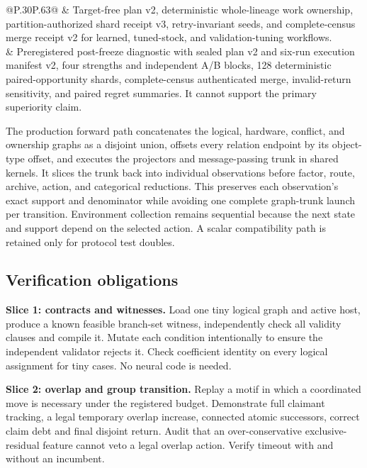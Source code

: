 {\begin{longtable}{@{}P{.30\textwidth}P{.63\textwidth}@{}}
\newline{} & Target-free plan v2, deterministic whole-lineage work ownership, partition-authorized shard receipt v3, retry-invariant seeds, and complete-census merge receipt v2 for learned, tuned-stock, and validation-tuning workflows.\\
 & Preregistered post-freeze diagnostic with sealed plan v2 and six-run execution manifest v2, four strengths and independent A/B blocks, 128 deterministic paired-opportunity shards, complete-census authenticated merge, invalid-return sensitivity, and paired regret summaries. It cannot support the primary superiority claim.\\
\bottomrule\end{longtable}}

The production forward path concatenates the logical, hardware, conflict, and ownership graphs as
a disjoint union, offsets every relation endpoint by its object-type offset, and executes the
projectors and message-passing trunk in shared kernels. It slices the trunk back into individual
observations before factor, route, archive, action, and categorical reductions. This preserves each
observation's exact support and denominator while avoiding one complete graph-trunk launch per
transition. Environment collection remains sequential because the next state and support depend on
the selected action. A scalar compatibility path is retained only for protocol test doubles.

\subsection{Verification obligations}
\textbf{Slice 1: contracts and witnesses.} Load one tiny logical graph and active host, produce a known feasible branch-set witness, independently check all validity clauses and compile it. Mutate each condition intentionally to ensure the independent validator rejects it. Check coefficient identity on every logical assignment for tiny cases. No neural code is needed.

\textbf{Slice 2: overlap and group transition.} Replay a motif in which a coordinated move is necessary under the registered budget. Demonstrate full claimant tracking, a legal temporary overlap increase, connected atomic successors, correct claim debt and final disjoint return. Audit that an over-conservative exclusive-residual feature cannot veto a legal overlap action. Verify timeout with and without an incumbent.

